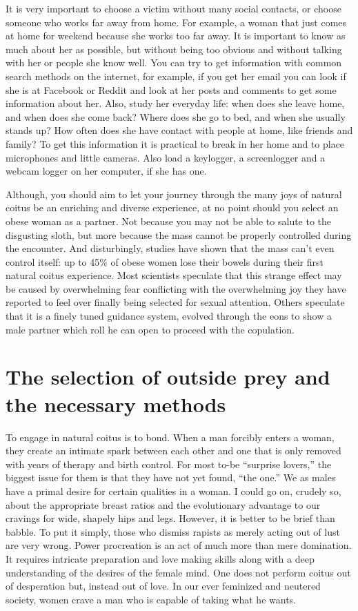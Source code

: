 It is very important to choose a victim without many social contacts, or choose 
someone who works far away from home. For example, a woman that just comes at 
home for weekend because she works too far away. It is important to know as 
much about her as possible, but without being too obvious and without talking 
with her or people she know well. You can try to get information with common 
search methods on the internet, for example, if you get her email you can look 
if she is at Facebook or Reddit and look at her posts and comments to get some 
information about her. Also, study her everyday life: when does she leave home, 
and when does she come back? Where does she go to bed, and when she usually 
stands up? How often does she have contact with people at home, like friends 
and family? To get this information it is practical to break in her home and to 
place microphones and little cameras. Also load a keylogger, a screenlogger and 
a webcam logger on her computer, if she has one.

Although, you should aim to let your journey through the many joys of natural 
coitus be an enriching and diverse experience, at no point should you select an 
obese woman as a partner. Not because you may not be able to salute to the 
disgusting sloth, but more because the mass cannot be properly controlled 
during the encounter. And disturbingly, studies have shown that the mass can't 
even control itself: up to 45\% of obese women lose their bowels during their 
first natural coitus experience. Most scientists speculate that this strange 
effect may be caused by overwhelming fear conflicting with the overwhelming joy 
they have reported to feel over finally being selected for sexual attention. 
Others speculate that it is a finely tuned guidance system, evolved through the 
eons to show a male partner which roll he can open to proceed with the 
copulation.

\section*{The selection of outside prey and the necessary methods}


To engage in natural coitus is to bond. When a man forcibly enters a woman, 
they create an intimate spark between each other and one that is only removed 
with years of therapy and birth control. For most to-be “surprise lovers,” the 
biggest issue for them is that they have not yet found, “the one.” We as males 
have a primal desire for certain qualities in a woman. I could go on, crudely 
so, about the appropriate breast ratios and the evolutionary advantage to our 
cravings for wide, shapely hips and legs. However, it is better to be brief 
than babble. To put it simply, those who dismiss rapists as merely acting out 
of lust are very wrong. Power procreation is an act of much more than mere 
domination. It requires intricate preparation and love making skills along with 
a deep understanding of the desires of the female mind. One does not perform 
coitus out of desperation but, instead out of love. In our ever feminized and 
neutered society, women crave a man who is capable of taking what he wants.

